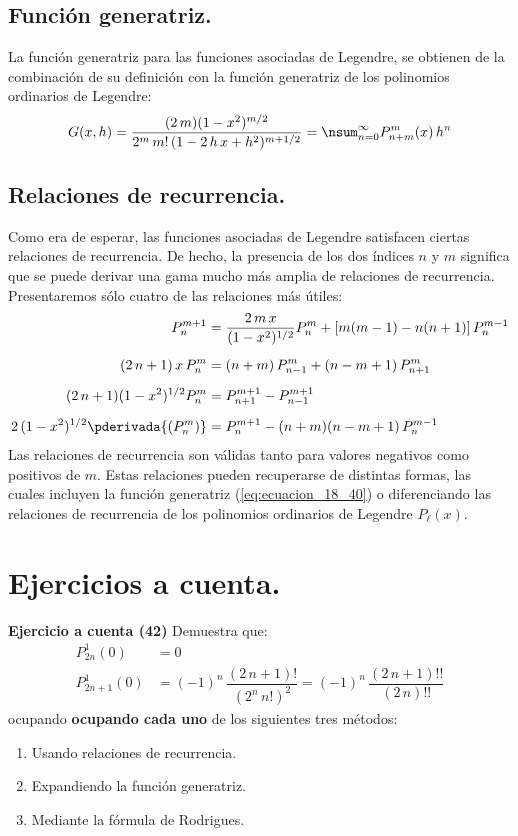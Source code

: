 \subsection{Función generatriz.}

La función generatriz para las funciones asociadas de Legendre, se obtienen de la combinación de su definición con la función generatriz de los polinomios ordinarios de Legendre:
\begin{align}
G(x, h) = \dfrac{(2 \, m)(1 - x^{2})^{m/2}}{2^{m} \, m! \, (1 - 2 \, h \, x + h^{2})^{m+1/2}} = \nsum_{n=0}^{\infty} P_{n+m}^{m} (x) \, h^{n}
\label{eq:ecuacion_18_40}
\end{align}

\subsection{Relaciones de recurrencia.}

Como era de esperar, las funciones asociadas de Legendre satisfacen ciertas relaciones de recurrencia. De hecho, la presencia de los dos índices $n$ y $m$ significa que se puede derivar una gama mucho más amplia de relaciones de recurrencia. Presentaremos sólo cuatro de las relaciones más útiles:
\begin{align*}
P_{n}^{m+1} &= \dfrac{2 \, m \, x}{(1 - x^{2})^{1/2}} P_{n}^{m} + [m (m - 1) - n (n + 1)] \, P_{n}^{m-1} \\[0.5em]
(2 \, n + 1) \, x \, P_{n}^{m} &= (n + m) \, P_{n-1}^{m} + (n - m + 1) \, P_{n+1}^{m} \\[0.5em]
(2 \, n + 1)(1 -  x^{2})^{1/2} P_{n}^{m} &= P_{n+1}^{m+1} - P_{n-1}^{m+1} \\[0.5em]
2 \, (1 - x^{2})^{1/2} \pderivada{(P_{n}^{m})} &= P_{n}^{m+1} - (n + m)(n - m + 1) \, P_{n}^{m-1}
\end{align*}
Las relaciones de recurrencia son válidas tanto para valores negativos como positivos de $m$. Estas relaciones pueden recuperarse de distintas formas, las cuales incluyen la función generatriz (\ref{eq:ecuacion_18_40}) o diferenciando las relaciones de recurrencia de los polinomios ordinarios de Legendre $P_{\ell}(x)$.

\section{Ejercicios a cuenta.}

\noindent
\textbf{Ejercicio a cuenta (42)} Demuestra que:
\begin{align*}
P_{2n}^{1} (0) &= 0 \\[0.5em]
P_{2n+1}^{1} (0) &= (-1)^{n} \, \dfrac{(2 \, n +1)!}{(2^{n} \, n!)^{2}} = (-1)^{n} \, \dfrac{(2 \, n + 1)!!}{(2 \, n)!!}
\end{align*}
ocupando \textbf{ocupando cada uno} de los siguientes tres métodos:
\begin{enumerate}[label=(\alph*)]
\item Usando relaciones de recurrencia.
\item Expandiendo la función generatriz.
\item Mediante la fórmula de Rodrigues.
\end{enumerate}

